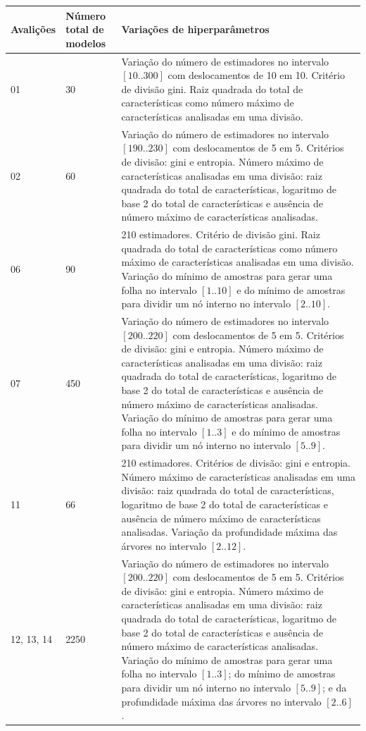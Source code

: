 \begin{table}[ht!]
  \begin{center}
  \setlength{\belowcaptionskip}{10pt}
  \footnotesize {
    \begin{tabular}{|p{1.5cm}|p{2cm}|p{12cm}|}
	  \hline
	  \textbf{Avalições} & \textbf{Número total de modelos} & \textbf{Variações de hiperparâmetros} \\
	  \hline
	  01 & 30 & Variação do número de estimadores no intervalo $[10 .. 300]$ com deslocamentos de 10 em 10. Critério de divisão gini. Raiz quadrada do total de características como número máximo de características analisadas em uma divisão. \\
	  \hline
    02 & 60 & Variação do número de estimadores no intervalo $[190 .. 230]$ com deslocamentos de 5 em 5. Critérios de divisão: gini e entropia. Número máximo de características analisadas em uma divisão: raiz quadrada do total de características, logaritmo de base 2 do total de características e ausência de número máximo de características analisadas. \\
    \hline
    06 & 90 & 210 estimadores. Critério de divisão gini. Raiz quadrada do total de características como número máximo de características analisadas em uma divisão. Variação do mínimo de amostras para gerar uma folha no intervalo $[1 .. 10]$ e do mínimo de amostras para dividir um nó interno no intervalo $[2 .. 10]$. \\
    \hline
    07 & 450 & Variação do número de estimadores no intervalo $[200 .. 220]$ com deslocamentos de 5 em 5. Critérios de divisão: gini e entropia. Número máximo de características analisadas em uma divisão: raiz quadrada do total de características, logaritmo de base 2 do total de características e ausência de número máximo de características analisadas. Variação do mínimo de amostras para gerar uma folha no intervalo $[1 .. 3]$ e do mínimo de amostras para dividir um nó interno no intervalo $[5 .. 9]$. \\
    \hline
    11 & 66 & 210 estimadores. Critérios de divisão: gini e entropia. Número máximo de características analisadas em uma divisão: raiz quadrada do total de características, logaritmo de base 2 do total de características e ausência de número máximo de características analisadas. Variação da profundidade máxima das árvores no intervalo $[2 .. 12]$. \\
    \hline
    12, 13, 14 & 2250 & Variação do número de estimadores no intervalo $[200 .. 220]$ com deslocamentos de 5 em 5. Critérios de divisão: gini e entropia. Número máximo de características analisadas em uma divisão: raiz quadrada do total de características, logaritmo de base 2 do total de características e ausência de número máximo de características analisadas. Variação do mínimo de amostras para gerar uma folha no intervalo $[1 .. 3]$; do mínimo de amostras para dividir um nó interno no intervalo $[5 .. 9]$; e da profundidade máxima das árvores no intervalo $[2 .. 6]$. \\

\end{tabular}}
\end{center}
\end{table}
